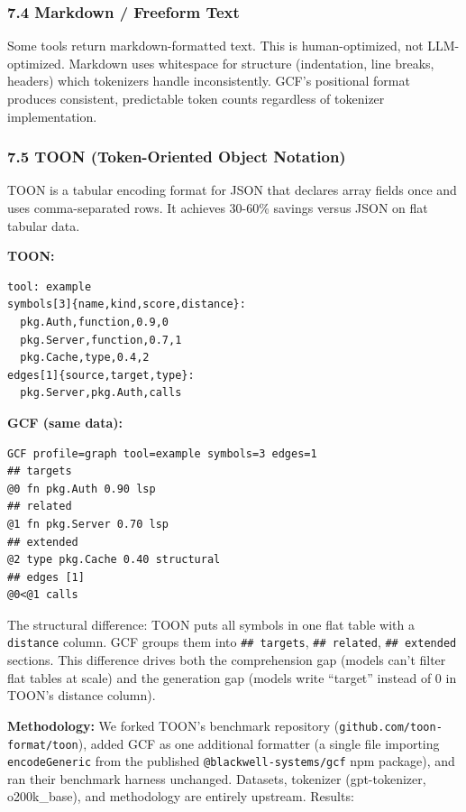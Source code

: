 \documentclass[
  11pt,
  paper=a4,
  ,captions=tableheading
]{scrartcl}
\begin{document}
\subsubsection{7.4 Markdown / Freeform
Text}\label{markdown-freeform-text}

Some tools return markdown-formatted text. This is human-optimized, not
LLM-optimized. Markdown uses whitespace for structure (indentation, line
breaks, headers) which tokenizers handle inconsistently. GCF's
positional format produces consistent, predictable token counts
regardless of tokenizer implementation.

\subsubsection{7.5 TOON (Token-Oriented Object
Notation)}\label{toon-token-oriented-object-notation}

TOON is a tabular encoding format for JSON that declares array fields
once and uses comma-separated rows. It achieves 30-60\% savings versus
JSON on flat tabular data.

\textbf{TOON:}

\begin{verbatim}
tool: example
symbols[3]{name,kind,score,distance}:
  pkg.Auth,function,0.9,0
  pkg.Server,function,0.7,1
  pkg.Cache,type,0.4,2
edges[1]{source,target,type}:
  pkg.Server,pkg.Auth,calls
\end{verbatim}

\textbf{GCF (same data):}

\begin{verbatim}
GCF profile=graph tool=example symbols=3 edges=1
## targets
@0 fn pkg.Auth 0.90 lsp
## related
@1 fn pkg.Server 0.70 lsp
## extended
@2 type pkg.Cache 0.40 structural
## edges [1]
@0<@1 calls
\end{verbatim}

The structural difference: TOON puts all symbols in one flat table with
a \texttt{distance} column. GCF groups them into \texttt{\#\#\ targets},
\texttt{\#\#\ related}, \texttt{\#\#\ extended} sections. This
difference drives both the comprehension gap (models can't filter flat
tables at scale) and the generation gap (models write ``target'' instead
of 0 in TOON's distance column).

\textbf{Methodology:} We forked TOON's benchmark repository
(\texttt{github.com/toon-format/toon}), added GCF as one additional
formatter (a single file importing \texttt{encodeGeneric} from the
published \texttt{@blackwell-systems/gcf} npm package), and ran their
benchmark harness unchanged. Datasets, tokenizer (gpt-tokenizer,
o200k\_base), and methodology are entirely upstream. Results:
\end{document}
